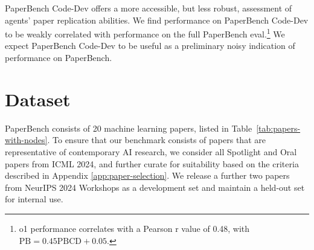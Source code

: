 \documentclass{article}
\theoremstyle{plain}
\theoremstyle{definition}
\theoremstyle{remark}
\begin{document}
PaperBench Code-Dev offers a more accessible, but less robust, assessment of agents' paper replication abilities. We find performance on PaperBench Code-Dev to be weakly correlated with performance on the full PaperBench eval.\footnote{o1 performance correlates with a Pearson r value of 0.48, with $\text{PB}=0.45\text{PBCD}+0.05$.} We expect PaperBench Code-Dev to be useful as a preliminary noisy indication of performance on PaperBench.

\section{Dataset}
\label{sec:dataset}

PaperBench consists of 20 machine learning papers, listed in Table~\ref{tab:papers-with-nodes}. To ensure that our benchmark consists of papers that are representative of contemporary AI research, we consider all Spotlight and Oral papers from ICML 2024, and further curate for suitability based on the criteria described in Appendix \ref{app:paper-selection}. We release a further two papers from NeurIPS 2024 Workshops as a development set and maintain a held-out set for internal use.
\end{document}
